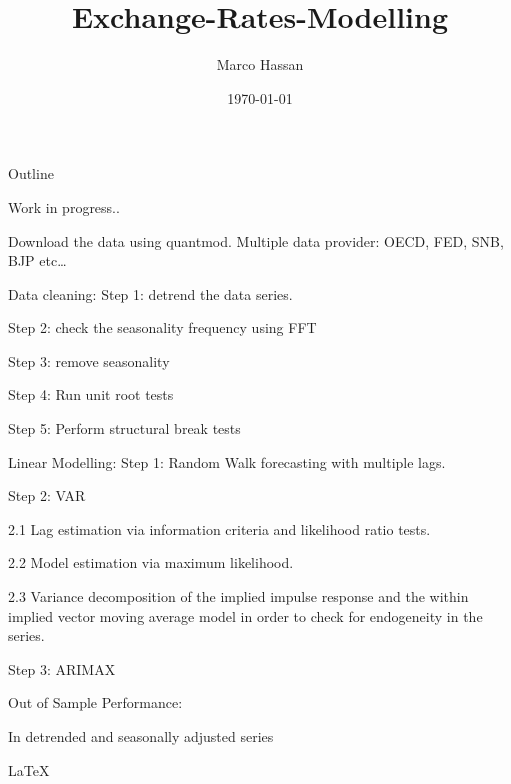 \documentclass[presentation]{beamer}
\author{Marco Hassan}
\date{\today}
\title{Exchange-Rates-Modelling}
\begin{document}
\maketitle
\begin{frame}{Outline}
\tableofcontents
\end{frame}

\alert{Work in progress..}

Download the data using quantmod. Multiple data provider: OECD, FED, SNB, BJP etc\ldots{}

\begin{frame}[label={sec:org1298dc9}]{Data cleaning:}
Step 1: detrend the data series.

Step 2: check the seasonality frequency using FFT

Step 3: remove seasonality

Step 4: Run unit root tests

Step 5: Perform structural break tests
\end{frame}

\begin{frame}[label={sec:org5f15c9b}]{Linear Modelling:}
Step 1: Random Walk forecasting with multiple lags.

Step 2: VAR 

2.1 Lag estimation via information criteria and likelihood ratio tests.

2.2 Model estimation via maximum likelihood. 

2.3 Variance decomposition of the implied impulse response and the within implied vector moving average model in order to check
for endogeneity in the series.

Step 3: ARIMAX
\end{frame}

\begin{frame}[label={sec:orgde0b548}]{Out of Sample Performance:}
\begin{block}{In detrended and seasonally adjusted series}
\latex



\begin{LaTeX}
\LaTeX
\end{LaTeX}
\end{block}
\end{frame}
\end{document}
